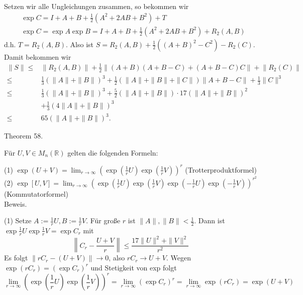 \documentclass[10pt, letterpaper]{article}
\begin{document}
Setzen wir alle Ungleichungen zusammen, so bekommen wir
$$
\begin{aligned}
& \exp C=I+A+B+\frac{1}{2}\left(A^{2}+2 A B+B^{2}\right)+T \\
& \exp C=\exp A \exp B=I+A+B+\frac{1}{2}\left(A^{2}+2 A B+B^{2}\right)+R_{2}(A, B)
\end{aligned}
$$
d.h. $T=R_{2}(A, B)$. Also ist $S=R_{2}(A, B)+\frac{1}{2}\left((A+B)^{2}-C^{2}\right)-R_{2}(C)$.
Damit bekommen wir
$$
\begin{aligned}
\|S\| \leq & \left\|R_{2}(A, B)\right\|+\frac{1}{2}\|(A+B)(A+B-C)+(A+B-C) C\|+\left\|R_{2}(C)\right\| \\
\leq & \frac{1}{3}(\|A\|+\|B\|)^{3}+\frac{1}{2}(\|A\|+\|B\|+\|C\|)\|A+B-C\|+\frac{1}{3}\|C\|^{3} \\
\leq & \frac{1}{3}(\|A\|+\|B\|)^{3}+\frac{5}{2}(\|A\|+\|B\|) \cdot 17(\|A\|+\|B\|)^{2} \\
& +\frac{1}{3}(4\|A\|+\|B\|)^{3} \\
\leq & 65(\|A\|+\|B\|)^{3} .
\end{aligned}
$$



Theorem 58. 

Für $U, V \in M_{n}(\mathbb{R})$ gelten die folgenden Formeln:

(1) $\exp (U+V)=\lim _{r \rightarrow \infty}\left(\exp \left(\frac{1}{r} U\right) \exp \left(\frac{1}{r} V\right)\right)^{r}$ (Trotterproduktformel)\\

(2) $\exp [U, V]=\lim _{r \rightarrow \infty}\left(\exp \left(\frac{1}{r} U\right) \exp \left(\frac{1}{r} V\right) \exp \left(-\frac{1}{r} U\right) \exp \left(-\frac{1}{r} V\right)\right)^{r^{2}}$ (Kommutatorformel)\\


Beweis. 

(1) Setze $A:=\frac{1}{r} U, B:=\frac{1}{r} V$. Für große $r$ ist $\|A\|,\|B\|< \frac{1}{2}$. Dann ist $\exp \frac{1}{r} U \exp \frac{1}{r} V=\exp C_{r}$ mit
$$
\left\|C_{r}-\frac{U+V}{r}\right\| \leq \frac{17\|U\|^{2}+\|V\|^{2}}{r^{2}}
$$
Es folgt $\left\|r C_{r}-(U+V)\right\| \rightarrow 0$, also $r C_{r} \rightarrow U+V$. Wegen $\exp \left(r C_{r}\right)=\left(\exp C_{r}\right)^{r}$ und Stetigkeit von exp folgt
$$\lim _{r \rightarrow \infty}\left(\exp \left(\frac{1}{r} U\right) \exp \left(\frac{1}{r} V\right)\right)^{r}=\lim _{r \rightarrow \infty}\left(\exp C_{r}\right)^{r}=\lim _{r \rightarrow \infty} \exp \left(r C_{r}\right)=\exp (U+V)$$
\end{document}
